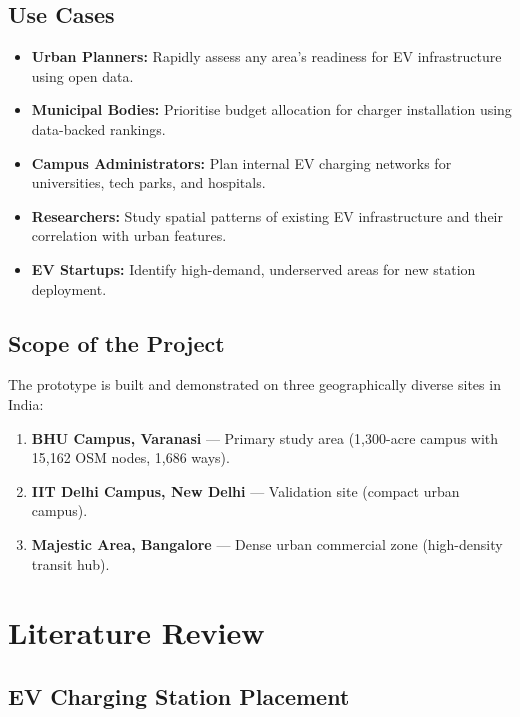 \documentclass[12pt, a4paper]{article}
\begin{document}
\subsection{Use Cases}

\begin{itemize}
    \item \textbf{Urban Planners:} Rapidly assess any area's readiness 
    for EV infrastructure using open data.
    \item \textbf{Municipal Bodies:} Prioritise budget allocation for 
    charger installation using data-backed rankings.
    \item \textbf{Campus Administrators:} Plan internal EV charging 
    networks for universities, tech parks, and hospitals.
    \item \textbf{Researchers:} Study spatial patterns of existing EV 
    infrastructure and their correlation with urban features.
    \item \textbf{EV Startups:} Identify high-demand, underserved 
    areas for new station deployment.
\end{itemize}

\subsection{Scope of the Project}

The prototype is built and demonstrated on three geographically 
diverse sites in India:

\begin{enumerate}
    \item \textbf{BHU Campus, Varanasi} — Primary study area 
    (1,300-acre campus with 15,162 OSM nodes, 1,686 ways).
    \item \textbf{IIT Delhi Campus, New Delhi} — Validation site 
    (compact urban campus).
    \item \textbf{Majestic Area, Bangalore} — Dense urban commercial 
    zone (high-density transit hub).
\end{enumerate}


\section{Literature Review}

\subsection{EV Charging Station Placement}
\end{document}
